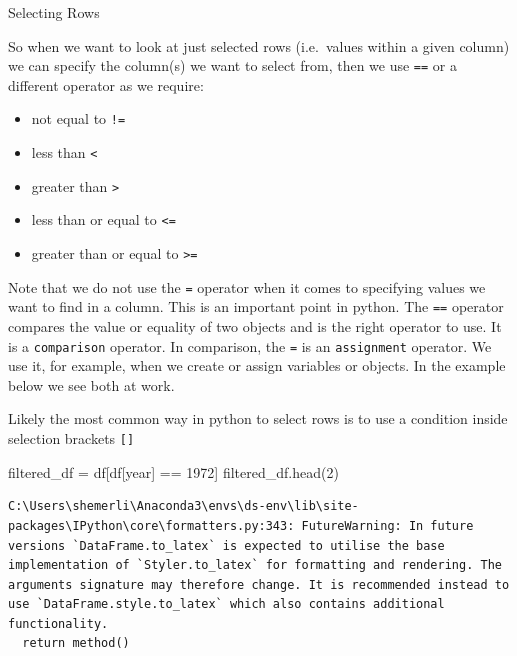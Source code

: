 \documentclass[
  letterpaper,
  DIV=11,
  numbers=noendperiod]{scrreprt}
\newenvironment{Shaded}{\begin{snugshade}}{\end{snugshade}}
\newcommand{\DecValTok}[1]{\textcolor[rgb]{0.68,0.00,0.00}{#1}}
\newcommand{\NormalTok}[1]{\textcolor[rgb]{0.00,0.23,0.31}{#1}}
\newcommand{\OperatorTok}[1]{\textcolor[rgb]{0.37,0.37,0.37}{#1}}
\newcommand{\StringTok}[1]{\textcolor[rgb]{0.13,0.47,0.30}{#1}}
\providecommand{\tightlist}{%
  \setlength{\itemsep}{0pt}\setlength{\parskip}{0pt}}\usepackage{longtable,booktabs,array}
\begin{document}
Selecting Rows

So when we want to look at just selected rows (i.e.~values within a
given column) we can specify the column(s) we want to select from, then
we use \texttt{==} or a different operator as we require:

\begin{itemize}
\tightlist
\item
  not equal to \texttt{!=}
\item
  less than \texttt{\textless{}}
\item
  greater than \texttt{\textgreater{}}
\item
  less than or equal to \texttt{\textless{}=}
\item
  greater than or equal to \texttt{\textgreater{}=}
\end{itemize}

Note that we do not use the \texttt{=} operator when it comes to
specifying values we want to find in a column. This is an important
point in python. The \texttt{==} operator compares the value or equality
of two objects and is the right operator to use. It is a
\texttt{comparison} operator. In comparison, the \texttt{=} is an
\texttt{assignment} operator. We use it, for example, when we create or
assign variables or objects. In the example below we see both at work.

Likely the most common way in python to select rows is to use a
condition inside selection brackets \texttt{{[}{]}}

\begin{Shaded}
\begin{Highlighting}[]
\NormalTok{filtered\_df }\OperatorTok{=}\NormalTok{ df[df[}\StringTok{\textquotesingle{}year\textquotesingle{}}\NormalTok{] }\OperatorTok{==} \DecValTok{1972}\NormalTok{]}
\NormalTok{filtered\_df.head(}\DecValTok{2}\NormalTok{)}
\end{Highlighting}
\end{Shaded}

\begin{verbatim}
C:\Users\shemerli\Anaconda3\envs\ds-env\lib\site-packages\IPython\core\formatters.py:343: FutureWarning: In future versions `DataFrame.to_latex` is expected to utilise the base implementation of `Styler.to_latex` for formatting and rendering. The arguments signature may therefore change. It is recommended instead to use `DataFrame.style.to_latex` which also contains additional functionality.
  return method()
\end{verbatim}
\end{document}
